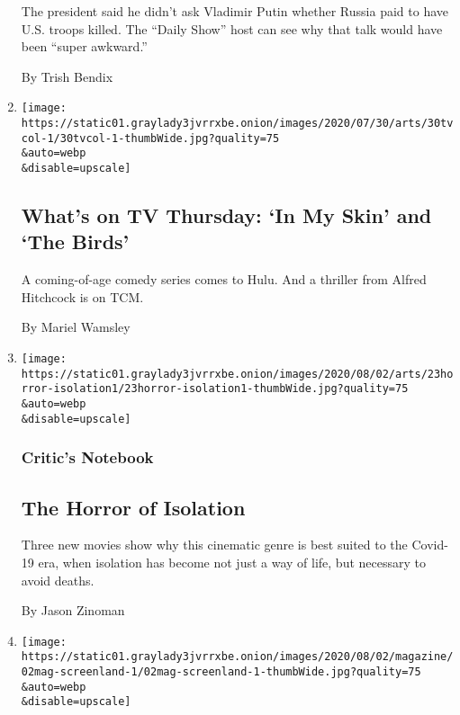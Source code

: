\begin{enumerate}
  The president said he didn't ask Vladimir Putin whether Russia paid to
  have U.S. troops killed. The ``Daily Show'' host can see why that talk
  would have been ``super awkward.''

  By Trish Bendix
\item
  \href{/2020/07/30/arts/television/whats-on-tv-thursday-in-my-skin-and-the-birds.html}{}

  \texttt{[image: https://static01.graylady3jvrrxbe.onion/images/2020/07/30/arts/30tvcol-1/30tvcol-1-thumbWide.jpg?quality=75\\\&auto=webp\\\&disable=upscale]}

  \hypertarget{whats-on-tv-thursday-in-my-skin-and-the-birds}{%
  \subsection{What's on TV Thursday: `In My Skin' and `The
  Birds'}\label{whats-on-tv-thursday-in-my-skin-and-the-birds}}

  A coming-of-age comedy series comes to Hulu. And a thriller from
  Alfred Hitchcock is on TCM.

  By Mariel Wamsley
\item
  \href{/2020/07/29/movies/horror-she-dies-tomorrow-relic-amulet.html}{}

  \texttt{[image: https://static01.graylady3jvrrxbe.onion/images/2020/08/02/arts/23horror-isolation1/23horror-isolation1-thumbWide.jpg?quality=75\\\&auto=webp\\\&disable=upscale]}

  \hypertarget{critics-notebook-3}{%
  \subsubsection{Critic's Notebook}\label{critics-notebook-3}}

  \hypertarget{the-horror-of-isolation}{%
  \subsection{The Horror of Isolation}\label{the-horror-of-isolation}}

  Three new movies show why this cinematic genre is best suited to the
  Covid-19 era, when isolation has become not just a way of life, but
  necessary to avoid deaths.

  By Jason Zinoman
\item
  \href{/2020/07/29/magazine/i-may-destroy-you-hbo-michaela-coel.html}{}

  \texttt{[image: https://static01.graylady3jvrrxbe.onion/images/2020/08/02/magazine/02mag-screenland-1/02mag-screenland-1-thumbWide.jpg?quality=75\\\&auto=webp\\\&disable=upscale]}


\end{enumerate}
